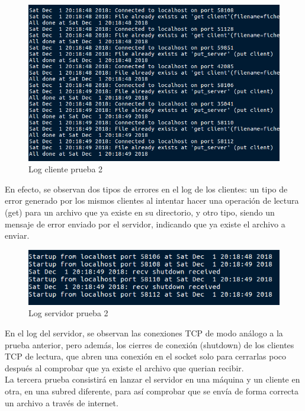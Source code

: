 \documentclass[journal, a4paper]{IEEEtran}
\begin{document}
\begin{figure}[H]
\centering
\includegraphics[scale=0.45]{images/log_cliente_prueba_2}
\caption{Log cliente prueba 2}
\end{figure}

En efecto, se observan dos tipos de errores en el log de los clientes: un tipo de error generado por los mismos clientes al intentar  hacer una operación de lectura (get) para un archivo que ya existe en su directorio, y otro tipo, siendo un mensaje de error enviado por el servidor, indicando que ya existe el archivo a enviar.

\begin{figure}[H]
\centering
\includegraphics[scale=0.6]{images/log_server_prueba_2}
\caption{Log servidor prueba 2}
\end{figure}

En el log del servidor, se observan las conexiones TCP de modo análogo a la prueba anterior, pero además, los cierres de conexión (shutdown) de los clientes TCP de lectura, que abren una conexión en el socket solo para cerrarlas poco después al comprobar que ya existe el archivo que querian recibir.\\

La tercera prueba consistirá en lanzar el servidor en una máquina y un cliente en otra, en una subred diferente, para así comprobar que se envía de forma correcta un archivo a través de internet.
\end{document}
